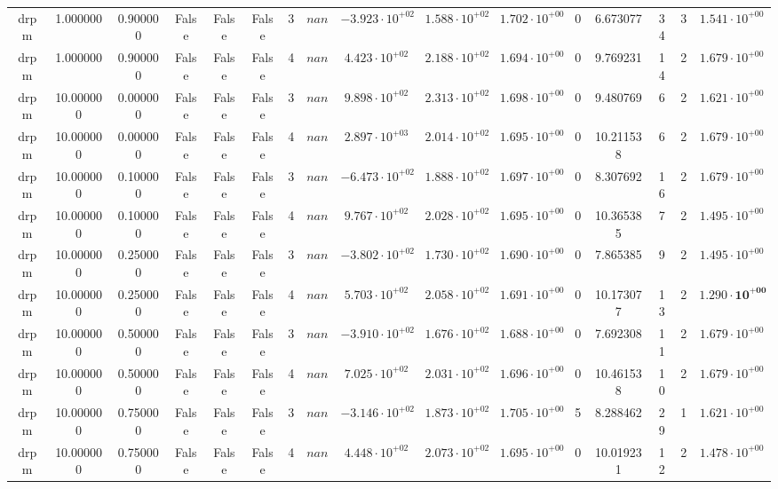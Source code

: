 \begin{table}
\begin{tabular}{cccccccccccccccc}
drpm & 1.000000 & 0.900000 & False & False & False & 3 & $nan$ & $-3.923 \cdot 10^{+02}$ & $1.588 \cdot 10^{+02}$ & $1.702 \cdot 10^{+00}$ & 0 & 6.673077 & 34 & 3 & $1.541 \cdot 10^{+00}$ \\
drpm & 1.000000 & 0.900000 & False & False & False & 4 & $nan$ & $4.423 \cdot 10^{+02}$ & $2.188 \cdot 10^{+02}$ & $1.694 \cdot 10^{+00}$ & 0 & 9.769231 & 14 & 2 & $1.679 \cdot 10^{+00}$ \\
drpm & 10.000000 & 0.000000 & False & False & False & 3 & $nan$ & $9.898 \cdot 10^{+02}$ & $2.313 \cdot 10^{+02}$ & $1.698 \cdot 10^{+00}$ & 0 & 9.480769 & 6 & 2 & $1.621 \cdot 10^{+00}$ \\
drpm & 10.000000 & 0.000000 & False & False & False & 4 & $nan$ & $2.897 \cdot 10^{+03}$ & $2.014 \cdot 10^{+02}$ & $1.695 \cdot 10^{+00}$ & 0 & 10.211538 & 6 & 2 & $1.679 \cdot 10^{+00}$ \\
drpm & 10.000000 & 0.100000 & False & False & False & 3 & $nan$ & $-6.473 \cdot 10^{+02}$ & $1.888 \cdot 10^{+02}$ & $1.697 \cdot 10^{+00}$ & 0 & 8.307692 & 16 & 2 & $1.679 \cdot 10^{+00}$ \\
drpm & 10.000000 & 0.100000 & False & False & False & 4 & $nan$ & $9.767 \cdot 10^{+02}$ & $2.028 \cdot 10^{+02}$ & $1.695 \cdot 10^{+00}$ & 0 & 10.365385 & 7 & 2 & $1.495 \cdot 10^{+00}$ \\
drpm & 10.000000 & 0.250000 & False & False & False & 3 & $nan$ & $-3.802 \cdot 10^{+02}$ & $1.730 \cdot 10^{+02}$ & $1.690 \cdot 10^{+00}$ & 0 & 7.865385 & 9 & 2 & $1.495 \cdot 10^{+00}$ \\
drpm & 10.000000 & 0.250000 & False & False & False & 4 & $nan$ & $5.703 \cdot 10^{+02}$ & $2.058 \cdot 10^{+02}$ & $1.691 \cdot 10^{+00}$ & 0 & 10.173077 & 13 & 2 & $\mathbf{1.290 \cdot 10^{+00}}$ \\
drpm & 10.000000 & 0.500000 & False & False & False & 3 & $nan$ & $-3.910 \cdot 10^{+02}$ & $1.676 \cdot 10^{+02}$ & $1.688 \cdot 10^{+00}$ & 0 & 7.692308 & 11 & 2 & $1.679 \cdot 10^{+00}$ \\
drpm & 10.000000 & 0.500000 & False & False & False & 4 & $nan$ & $7.025 \cdot 10^{+02}$ & $2.031 \cdot 10^{+02}$ & $1.696 \cdot 10^{+00}$ & 0 & 10.461538 & 10 & 2 & $1.679 \cdot 10^{+00}$ \\
drpm & 10.000000 & 0.750000 & False & False & False & 3 & $nan$ & $-3.146 \cdot 10^{+02}$ & $1.873 \cdot 10^{+02}$ & $1.705 \cdot 10^{+00}$ & 5 & 8.288462 & 29 & 1 & $1.621 \cdot 10^{+00}$ \\
drpm & 10.000000 & 0.750000 & False & False & False & 4 & $nan$ & $4.448 \cdot 10^{+02}$ & $2.073 \cdot 10^{+02}$ & $1.695 \cdot 10^{+00}$ & 0 & 10.019231 & 12 & 2 & $1.478 \cdot 10^{+00}$ \\

\end{tabular}
\end{table}
